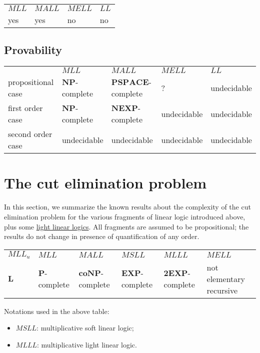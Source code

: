 \begin{longtable}[]{@{}llll@{}}
\toprule
\(MLL\) & \(MALL\) & \(MELL\) & \(LL\)\tabularnewline
yes & yes & no & no\tabularnewline
\bottomrule
\end{longtable}

\subsection{Provability}\label{provability}

\begin{longtable}[]{@{}lllll@{}}
\toprule
& \(MLL\) & \(MALL\) & \(MELL\) & \(LL\)\tabularnewline
propositional case & \(\mathbf{NP}\)-complete &
\(\mathbf{PSPACE}\)-complete & ? & undecidable\tabularnewline
first order case & \(\mathbf{NP}\)-complete & \(\mathbf{NEXP}\)-complete
& undecidable & undecidable\tabularnewline
second order case & undecidable & undecidable & undecidable &
undecidable\tabularnewline
\bottomrule
\end{longtable}

\section{The cut elimination
problem}\label{the-cut-elimination-problem}

In this section, we summarize the known results about the complexity of
the cut elimination problem for the various fragments of linear logic
introduced above, plus some \href{light_linear_logics}{light linear
logics}. All fragments are assumed to be propositional; the results do
not change in presence of quantification of any order.

\begin{longtable}[]{@{}llllll@{}}
\toprule
\(MLL_u\) & \(MLL\) & \(MALL\) & \(MSLL\) & \(MLLL\) &
\(MELL\)\tabularnewline
\(\mathbf L\) & \(\mathbf{P}\)-complete & \(\mathbf{coNP}\)-complete &
\(\mathbf{EXP}\)-complete & \(\mathbf{2EXP}\)-complete & not elementary
recursive\tabularnewline
\bottomrule
\end{longtable}

Notations used in the above table:

\begin{itemize}
\tightlist
\item
  \(MSLL\): multiplicative soft linear logic;
\item
  \(MLLL\): multiplicative light linear logic.
\end{itemize}


